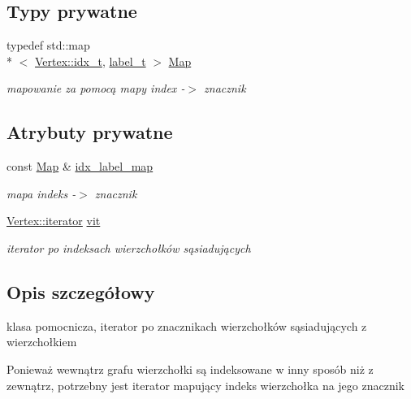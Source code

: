 \subsection*{Typy prywatne}
\begin{DoxyCompactItemize}
\item 
typedef std\-::map\\*
$<$ \hyperlink{classVertex_a12fe2194264f72b70b284bba723052c1}{Vertex\-::idx\-\_\-t}, \hyperlink{classGraph_a2237a0ada8484c37b8200c0e3685ca71}{label\-\_\-t} $>$ \hyperlink{classGraph_1_1AdjIter_a288bf18f510dc63ed539c9f55919e38b}{Map}
\begin{DoxyCompactList}\small\item\em mapowanie za pomocą mapy index -\/$>$ znacznik \end{DoxyCompactList}\end{DoxyCompactItemize}
\subsection*{Atrybuty prywatne}
\begin{DoxyCompactItemize}
\item 
const \hyperlink{classGraph_1_1AdjIter_a288bf18f510dc63ed539c9f55919e38b}{Map} \& \hyperlink{classGraph_1_1AdjIter_a1e4efc1aa5f449f16e1f8651bab11987}{idx\-\_\-label\-\_\-map}
\begin{DoxyCompactList}\small\item\em mapa indeks -\/$>$ znacznik \end{DoxyCompactList}\item 
\hyperlink{classVertex_ac889dee153c9abe7b3fb652ec6583df9}{Vertex\-::iterator} \hyperlink{classGraph_1_1AdjIter_ad76d2b5dfade41f5c25cfc02e26dd6e7}{vit}
\begin{DoxyCompactList}\small\item\em iterator po indeksach wierzchołków sąsiadujących \end{DoxyCompactList}\end{DoxyCompactItemize}


\subsection{Opis szczegółowy}
klasa pomocnicza, iterator po znacznikach wierzchołków sąsiadujących z wierzchołkiem 

Ponieważ wewnątrz grafu wierzchołki są indeksowane w inny sposób niż z zewnątrz, potrzebny jest iterator mapujący indeks wierzchołka na jego znacznik 

